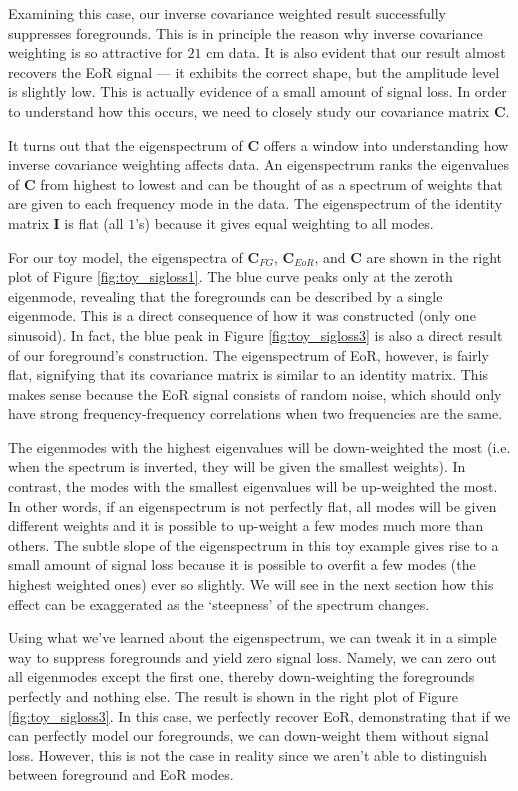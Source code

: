 \documentclass[preprint2,numberedappendix,tighten,twocolappendix]{aastex6}  %
\begin{document}
Examining this case, our inverse covariance weighted result successfully suppresses foregrounds. This is in principle the reason why inverse covariance weighting is so attractive for $21$ cm data. It is also evident that our result almost recovers the EoR signal --- it exhibits the correct shape, but the amplitude level is slightly low. This is actually evidence of a small amount of signal loss. In order to understand how this occurs, we need to closely study our covariance matrix $\textbf{C}$.

It turns out that the eigenspectrum of $\textbf{C}$ offers a window into understanding how inverse covariance weighting affects data. An eigenspectrum ranks the eigenvalues of $\textbf{C}$ from highest to lowest and can be thought of as a spectrum of weights that are given to each frequency mode in the data. The eigenspectrum of the identity matrix $\textbf{I}$ is flat (all $1$'s) because it gives equal weighting to all modes. 

For our toy model, the eigenspectra of $\textbf{C}_{FG}$, $\textbf{C}_{EoR}$, and $\textbf{C}$ are shown in the right plot of Figure \ref{fig:toy_sigloss1}. The blue curve peaks only at the zeroth eigenmode, revealing that the foregrounds can be described by a single eigenmode. This is a direct consequence of how it was constructed (only one sinusoid). In fact, the blue peak in Figure \ref{fig:toy_sigloss3} is also a direct result of our foreground's construction. The eigenspectrum of EoR, however, is fairly flat, signifying that its covariance matrix is similar to an identity matrix. This makes sense because the EoR signal consists of random noise, which should only have strong frequency-frequency correlations when two frequencies are the same.

The eigenmodes with the highest eigenvalues will be down-weighted the most (i.e. when the spectrum is inverted, they will be given the smallest weights). In contrast, the modes with the smallest eigenvalues will be up-weighted the most. In other words, if an eigenspectrum is not perfectly flat, all modes will be given different weights and it is possible to up-weight a few modes much more than others. The subtle slope of the eigenspectrum in this toy example gives rise to a small amount of signal loss because it is possible to overfit a few modes (the highest weighted ones) ever so slightly. We will see in the next section how this effect can be exaggerated as the `steepness' of the spectrum changes.

Using what we've learned about the eigenspectrum, we can tweak it in a simple way to suppress foregrounds and yield zero signal loss. Namely, we can zero out all eigenmodes except the first one, thereby down-weighting the foregrounds perfectly and nothing else. The result is shown in the right plot of Figure \ref{fig:toy_sigloss3}. In this case, we perfectly recover EoR, demonstrating that if we can perfectly model our foregrounds, we can down-weight them without signal loss. However, this is not the case in reality since we aren't able to distinguish between foreground and EoR modes.
\end{document}
